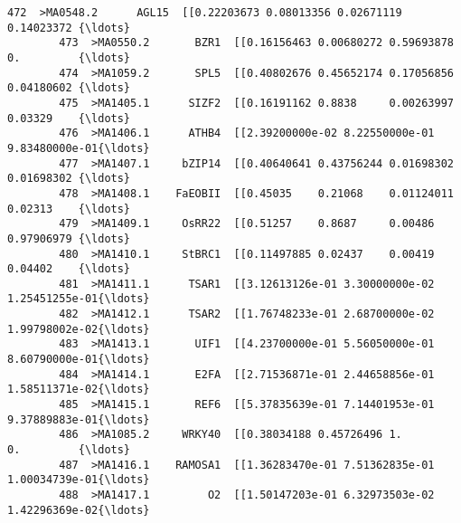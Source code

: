 \documentclass[11pt]{article}
\begin{document}
\begin{Verbatim}[commandchars=\\\{\}]
        472  >MA0548.2      AGL15  [[0.22203673 0.08013356 0.02671119 0.14023372 {\ldots}   
        473  >MA0550.2       BZR1  [[0.16156463 0.00680272 0.59693878 0.         {\ldots}   
        474  >MA1059.2       SPL5  [[0.40802676 0.45652174 0.17056856 0.04180602 {\ldots}   
        475  >MA1405.1      SIZF2  [[0.16191162 0.8838     0.00263997 0.03329    {\ldots}   
        476  >MA1406.1      ATHB4  [[2.39200000e-02 8.22550000e-01 9.83480000e-01{\ldots}   
        477  >MA1407.1     bZIP14  [[0.40640641 0.43756244 0.01698302 0.01698302 {\ldots}   
        478  >MA1408.1    FaEOBII  [[0.45035    0.21068    0.01124011 0.02313    {\ldots}   
        479  >MA1409.1     OsRR22  [[0.51257    0.8687     0.00486    0.97906979 {\ldots}   
        480  >MA1410.1     StBRC1  [[0.11497885 0.02437    0.00419    0.04402    {\ldots}   
        481  >MA1411.1      TSAR1  [[3.12613126e-01 3.30000000e-02 1.25451255e-01{\ldots}   
        482  >MA1412.1      TSAR2  [[1.76748233e-01 2.68700000e-02 1.99798002e-02{\ldots}   
        483  >MA1413.1       UIF1  [[4.23700000e-01 5.56050000e-01 8.60790000e-01{\ldots}   
        484  >MA1414.1       E2FA  [[2.71536871e-01 2.44658856e-01 1.58511371e-02{\ldots}   
        485  >MA1415.1       REF6  [[5.37835639e-01 7.14401953e-01 9.37889883e-01{\ldots}   
        486  >MA1085.2     WRKY40  [[0.38034188 0.45726496 1.         0.         {\ldots}   
        487  >MA1416.1    RAMOSA1  [[1.36283470e-01 7.51362835e-01 1.00034739e-01{\ldots}   
        488  >MA1417.1         O2  [[1.50147203e-01 6.32973503e-02 1.42296369e-02{\ldots}   
        

\end{Verbatim}
\end{document}
